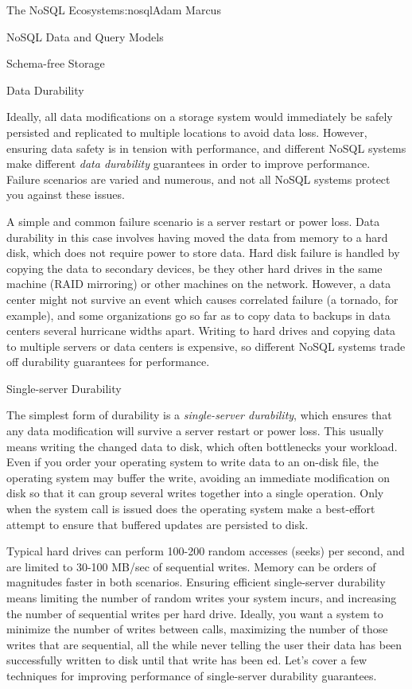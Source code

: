 \begin{aosachapter}{The NoSQL Ecosystem}{s:nosql}{Adam Marcus}
\begin{aosasect1}{NoSQL Data and Query Models}
\begin{aosasect2}{Schema-free Storage }
\end{aosasect2}

\end{aosasect1}

\begin{aosasect1}{Data Durability}

Ideally, all data modifications on a storage system would immediately
be safely persisted and replicated to multiple locations to avoid data
loss.  However, ensuring data safety is in tension with performance,
and different NoSQL systems make different \emph{data durability}
guarantees in order to improve performance.  Failure scenarios are
varied and numerous, and not all NoSQL systems protect you against
these issues.

A simple and common failure scenario is a server restart or power
loss.  Data durability in this case involves having moved the data
from memory to a hard disk, which does not require power to store
data.  Hard disk failure is handled by copying the data to secondary
devices, be they other hard drives in the same machine (RAID
mirroring) or other machines on the network.  However, a data center
might not survive an event which causes correlated failure (a tornado, for example), and some
organizations go so far as to copy data to backups in data centers
several hurricane widths apart. Writing to hard drives and copying
data to multiple servers or data centers is expensive, so different
NoSQL systems trade off durability guarantees for performance.

\begin{aosasect2}{Single-server Durability}

The simplest form of durability is a \emph{single-server durability},
which ensures that any data modification will survive a server restart
or power loss.  This usually means writing the changed data to disk,
which often bottlenecks your workload.  Even if you order your
operating system to write data to an on-disk file, the operating
system may buffer the write, avoiding an immediate modification on
disk so that it can group several writes together into a single
operation.  Only when the  system call is issued does the
operating system make a best-effort attempt to ensure that buffered
updates are persisted to disk.

Typical hard drives can perform 100-200 random accesses (seeks) per
second, and are limited to 30-100 MB/sec of sequential writes.  Memory can be orders of magnitudes faster in both scenarios.  Ensuring
efficient single-server durability means limiting the number of random
writes your system incurs, and increasing the number of sequential
writes per hard drive. Ideally, you want a system to minimize the
number of writes between  calls, maximizing the number of
those writes that are sequential, all the while never telling the user
their data has been successfully written to disk until that write has
been ed.  Let's cover a few techniques for improving
performance of single-server durability guarantees.


\end{aosasect2}
\end{aosasect1}
\end{aosachapter}
